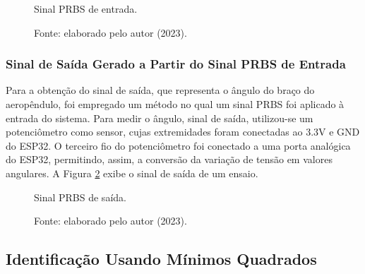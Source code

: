 \begin{figure}[!h]
	\centering
	\caption{Sinal PRBS de entrada.}
	\caption*{Fonte: elaborado pelo autor (2023).}
	\label{fig3:image_18}
\end{figure}



\subsubsection{Sinal de Saída Gerado a Partir do Sinal PRBS de Entrada}

Para a obtenção do sinal de saída, que representa o ângulo do braço do aeropêndulo, foi empregado um método no qual um sinal PRBS foi aplicado à entrada do sistema. Para medir o ângulo, sinal de saída, utilizou-se um potenciômetro como sensor, cujas extremidades foram conectadas ao 3.3V e GND do ESP32. O terceiro fio do potenciômetro foi conectado a uma porta analógica do ESP32, permitindo, assim, a conversão da variação de tensão em valores angulares. A Figura \ref{fig3:image_19} exibe o sinal de saída de um ensaio.

\begin{figure}[!h]
	\centering
	\caption{Sinal PRBS de saída.}
	\caption*{Fonte: elaborado pelo autor (2023).}
	\label{fig3:image_19}
\end{figure}

\subsection{Identificação Usando Mínimos Quadrados}


